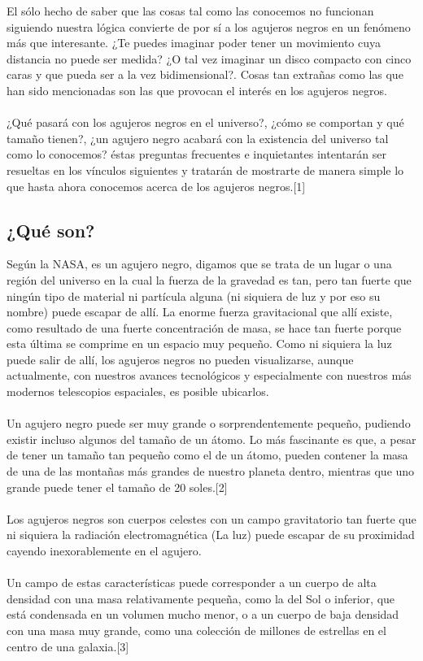 \documentclass[12pt]{article}
\begin{document}
El sólo hecho de saber que las cosas tal como las conocemos no funcionan siguiendo nuestra lógica convierte de por sí a los agujeros negros en un fenómeno más que interesante. ¿Te puedes imaginar poder tener un movimiento cuya distancia no puede ser medida? ¿O tal vez imaginar un disco compacto con cinco caras y que pueda ser a la vez bidimensional?. Cosas tan extrañas como las que han sido mencionadas son las que provocan el interés en los agujeros negros.\\\\
¿Qué pasará con los agujeros negros en el universo?, ¿cómo se comportan y qué tamaño tienen?, ¿un agujero negro acabará con la existencia del universo tal como lo conocemos? éstas preguntas frecuentes e inquietantes intentarán ser resueltas en los vínculos siguientes y tratarán de mostrarte de manera simple lo que hasta ahora conocemos acerca de los agujeros negros.[1]
\\%

\subsection{¿Qué son?}
Según la NASA, es un agujero negro, digamos que se trata de un lugar o una región del universo en la cual la fuerza de la gravedad es tan, pero tan fuerte que ningún tipo de material ni partícula alguna (ni siquiera de luz y por eso su nombre) puede escapar de allí. La enorme fuerza gravitacional que allí existe, como resultado de una fuerte concentración de masa, se hace tan fuerte porque esta última se comprime en un espacio muy pequeño. Como ni siquiera la luz puede salir de allí, los agujeros negros no pueden visualizarse, aunque actualmente, con nuestros avances tecnológicos y especialmente con nuestros más modernos telescopios espaciales, es posible ubicarlos.
 \\\\
 Un agujero negro puede ser muy grande o sorprendentemente pequeño, pudiendo existir incluso algunos del tamaño de un átomo. Lo más fascinante es que, a pesar de tener un tamaño tan pequeño como el de un átomo, pueden contener la masa de una de las montañas más grandes de nuestro planeta dentro, mientras que uno grande puede tener el tamaño de 20 soles.[2]
 \\%
 \\
 Los agujeros negros son cuerpos celestes con un campo gravitatorio tan fuerte que ni siquiera la radiación electromagnética (La luz) puede escapar de su proximidad cayendo inexorablemente en el agujero.\\\\
 Un campo de estas características puede corresponder a un cuerpo de alta densidad con una masa relativamente pequeña, como la del Sol o inferior, que está condensada en un volumen mucho menor, o a un cuerpo de baja densidad con una masa muy grande, como una colección de millones de estrellas en el centro de una galaxia.[3]\\%
 
\end{document}

